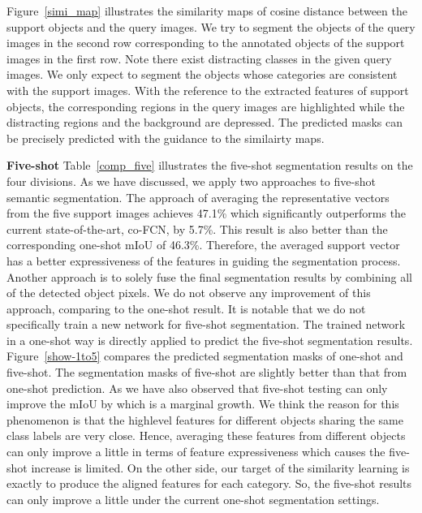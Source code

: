 \documentclass[journal]{IEEEtran}
\begin{document}
Figure~\ref{simi_map} illustrates the similarity maps of cosine distance between the support objects and the query images.
We try to segment the objects of the query images in the second row corresponding to the annotated objects of the support images in the first row.
Note there exist distracting classes in the given query images. 
We only expect to segment the objects whose categories are consistent with the support images.
With the reference to the extracted features of support objects, the corresponding regions in the query images are highlighted while the distracting regions and the background are depressed.
The predicted masks can be precisely predicted with the guidance to the similairty maps.


\noindent \textbf{Five-shot}
Table~\ref{comp_five} illustrates the five-shot segmentation results on the four divisions. 
As we have discussed, we apply two approaches to five-shot semantic segmentation.
The approach of averaging the representative vectors from the five support images achieves 47.1\% which significantly outperforms the current state-of-the-art, co-FCN, by 5.7\%.
This result is also better than the corresponding one-shot mIoU of 46.3\%.
Therefore, the averaged support vector has a better expressiveness of the features in guiding the segmentation process.
Another approach is to solely fuse the final segmentation results by combining all of the detected object pixels.
We do not observe any improvement of this approach, comparing to the one-shot result.
It is notable that we do not specifically train a new network for five-shot segmentation.
The trained network in a one-shot way is directly applied to predict the five-shot segmentation results.
Figure~\ref{show-1to5} compares the predicted segmentation masks of one-shot and five-shot.
The segmentation masks of five-shot are slightly better than that from one-shot prediction.
As we have also observed that five-shot testing can only improve the mIoU by  which is a marginal growth. 
We think the reason for this phenomenon is that the highlevel features for different objects sharing the same class labels are very close.
Hence, averaging these features from different objects can only improve a little in terms of feature expressiveness which causes the five-shot increase is limited.
On the other side, our target of the similarity learning is exactly to produce the aligned features for each category.
So, the five-shot results can only improve a little under the current one-shot segmentation settings.
\end{document}

